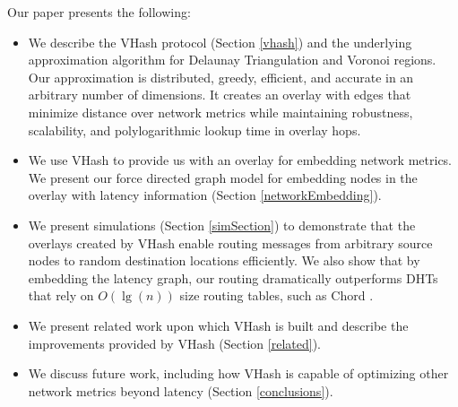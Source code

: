 \documentclass[10pt, conference, letterpaper]{IEEEtran}
\begin{document}
Our paper presents the following:
\begin{itemize}
	\item We describe the VHash protocol (Section \ref{vhash}) and the underlying approximation algorithm for Delaunay Triangulation and Voronoi regions.
    Our approximation is distributed, greedy, efficient, and accurate in an arbitrary number of dimensions.
     It creates an overlay with edges that minimize distance over network metrics while maintaining robustness, scalability, and polylogarithmic lookup time in overlay hops.
	\item We use VHash to provide us with an overlay for embedding network metrics.
    We present our force directed graph model for embedding nodes in the overlay with latency information (Section \ref{networkEmbedding}).%
	\item We present simulations (Section \ref{simSection}) to demonstrate that the overlays created by VHash enable routing messages from arbitrary source nodes to random destination locations efficiently.
    We also show that by embedding the latency graph, our routing dramatically outperforms DHTs that rely on $O(\lg(n))$ size routing tables, such as Chord \cite{chord}.
	\item We present related work upon which VHash is built and describe the improvements provided by VHash (Section \ref{related}).
	\item We discuss future work, including how VHash is capable of optimizing other network metrics beyond latency (Section \ref{conclusions}).
\end{itemize}

\end{document}
